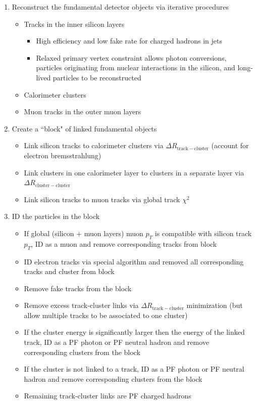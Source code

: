 \documentclass[dissertation.tex]{subfiles}
\begin{document}
\begin{enumerate}
\item Reconstruct the fundamental detector objects via iterative procedures
\begin{itemize}
\item Tracks in the inner silicon layers
\begin{itemize}
\item High efficiency and low fake rate for charged hadrons in jets
\item Relaxed primary vertex constraint allows photon conversions, particles originating from nuclear interactions in the silicon, and long-lived particles to be reconstructed
\end{itemize}
\item Calorimeter clusters
\item Muon tracks in the outer muon layers
\end{itemize}
\item Create a ``block" of linked fundamental objects
\begin{itemize}
\item Link silicon tracks to calorimeter clusters via $\Delta R_{\mathrm{track-cluster}}$ (account for electron bremsstrahlung)
\item Link clusters in one calorimeter layer to clusters in a separate layer via $\Delta R_{\mathrm{cluster-cluster}}$
\item Link silicon tracks to muon tracks via global track $\chi^{2}$
\end{itemize}
\item ID the particles in the block
\begin{itemize}
\item If global (silicon + muon layers) muon $p_{T}$ is compatible with silicon track $p_{T}$, ID as a muon and remove corresponding tracks from block
\item ID electron tracks via special algorithm and removed all corresponding tracks and cluster from block
\item Remove fake tracks from the block
\item \marginpar{\textcolor{blue}{Fixed typo}}Remove excess track-cluster links via $\Delta R_{\mathrm{track-cluster}}$ minimization (but allow multiple tracks to be associated to one cluster)
\item If the cluster energy is significantly larger then the energy of the linked track, ID as a PF photon or PF neutral hadron and remove corresponding clusters from the block
\item If the cluster is not linked to a track, ID as a PF photon or PF neutral hadron and remove corresponding clusters from the block
\item Remaining track-cluster links are PF charged hadrons
\end{itemize}
\end{enumerate}
\end{document}
